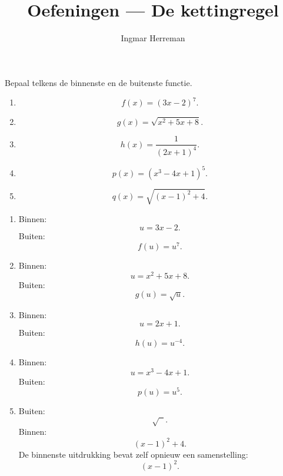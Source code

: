 \documentclass{ximera}
\title{Oefeningen — De kettingregel}
\author{Ingmar Herreman}
\begin{document}




\maketitle



\begin{oefening}{\oefB\ESS}

Bepaal telkens de binnenste en de buitenste functie.

\begin{enumerate}
  \item \[f(x)=(3x-2)^7.\]
  \item \[g(x)=\sqrt{x^2+5x+8}.\]
  \item \[h(x)=\frac{1}{(2x+1)^4}.\]
  \item \[p(x)=\left(x^3-4x+1\right)^5.\]
  \item \[q(x)=\sqrt{(x-1)^2+4}.\]
\end{enumerate}

\begin{oplossing}
\begin{enumerate}
  \item Binnen: \[u=3x-2.\] Buiten: \[f(u)=u^7.\]
  \item Binnen: \[u=x^2+5x+8.\] Buiten: \[g(u)=\sqrt{u}.\]
  \item Binnen: \[u=2x+1.\] Buiten: \[h(u)=u^{-4}.\]
  \item Binnen: \[u=x^3-4x+1.\] Buiten: \[p(u)=u^5.\]
  \item Buiten: \[\sqrt{\phantom{x}}.\] Binnen: \[(x-1)^2+4.\]
  De binnenste uitdrukking bevat zelf opnieuw een samenstelling:
  \[(x-1)^2.\]
\end{enumerate}
\end{oplossing}

\end{oefening}
\end{document}
